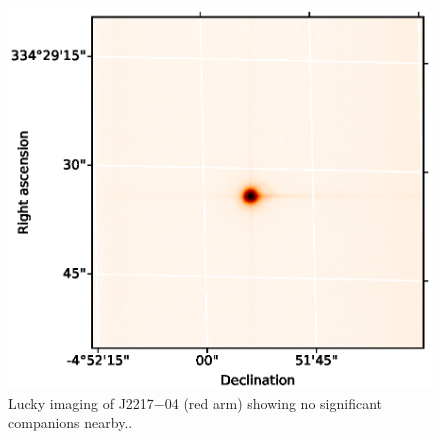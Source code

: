 \begin{figure}
    \centering
    \includegraphics{8-Results/J2217-04/lucky.eps}
    \caption{Lucky imaging of J2217$-$04 (red arm) showing no significant companions nearby..}
    \label{fig:J2217-04:lucky}
\end{figure}

